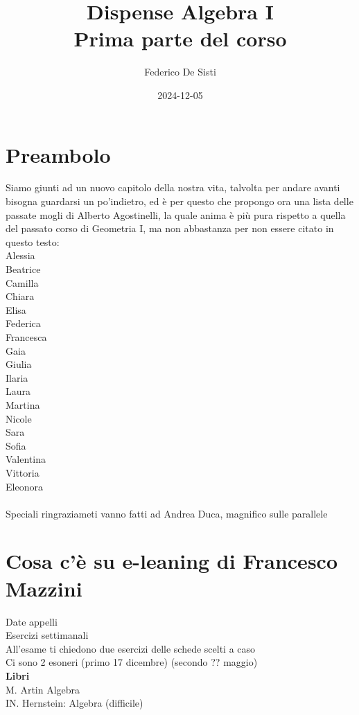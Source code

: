\documentclass[12px]{article}
\title{Dispense Algebra I\\[5px] \normalsize Prima parte del corso}
\date{2024-12-05}
\author{Federico De Sisti}
\begin{document}
	\maketitle
	\newpage

	\tableofcontents
	\newpage


	\section{Preambolo}
	Siamo giunti ad un nuovo capitolo della nostra vita, talvolta per andare avanti bisogna guardarsi un po'indietro, ed è per questo che propongo ora una lista delle passate mogli di Alberto Agostinelli, la quale anima è più pura rispetto a quella del passato corso di Geometria I, ma non abbastanza per non essere citato in questo testo:\\[10px]
Alessia\\
Beatrice\\
Camilla\\
Chiara\\
Elisa\\
Federica\\
Francesca\\
Gaia\\
Giulia\\
Ilaria\\
Laura\\
Martina\\
Nicole\\
Sara\\
Sofia\\
Valentina\\
Vittoria\\
Eleonora\\
\vfill \ \\
Speciali ringraziameti vanno fatti ad Andrea Duca, magnifico sulle parallele
\newpage

	\section{Cosa c'è su e-leaning di Francesco Mazzini}
	Date appelli\\
	Esercizi settimanali\\
	All'esame ti chiedono due esercizi delle schede scelti a caso\\
	Ci sono 2 esoneri (primo 17 dicembre) (secondo ?? maggio)\\
\textbf{Libri}\\
M. Artin Algebra\\
IN. Hernstein: Algebra (difficile)\\
\end{document}
